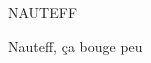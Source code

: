 \documentclass[a4paper,11pt]{report}
\begin{document}
	NAUTEFF
	\begin{Huge}
		\begin{chancery}

			
			Nauteff, ça bouge peu
		\end{chancery}

	\end{Huge}
\end{document}
